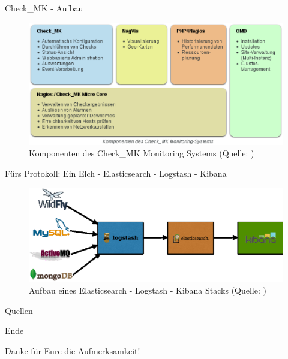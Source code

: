 \documentclass[12pt]{beamer}              %
\begin{document}
\begin{frame}{Check\_MK - Aufbau}
	\begin{figure}
		\centering
		\includegraphics[width=1\textwidth]{pics/checkMKAufbau.eps}
		\caption[Komponenten des Check\_MK Monitoring Systems]{Komponenten des Check\_MK Monitoring Systems (Quelle: \textcite{checkmkmonitoringpic})}
	\end{figure}
\end{frame}
\begin{frame}{Fürs Protokoll: Ein Elch - Elasticsearch - Logstash - Kibana}
\begin{figure}
		\centering
		\includegraphics[width=1\textwidth]{pics/elk-stack.eps}
		\caption[Aufbau eines Elasticsearch - Logstash - Kibana Stacks]{Aufbau eines Elasticsearch - Logstash - Kibana Stacks (Quelle: \textcite{elkstackpic})}
	\end{figure}
\end{frame}
\begin{frame}{Quellen}
	\printbibliography
\end{frame}
\begin{frame}{Ende}
	\begin{center}
	Danke für Eure die Aufmerksamkeit!
	\end{center}
	
\end{frame}
\end{document}

